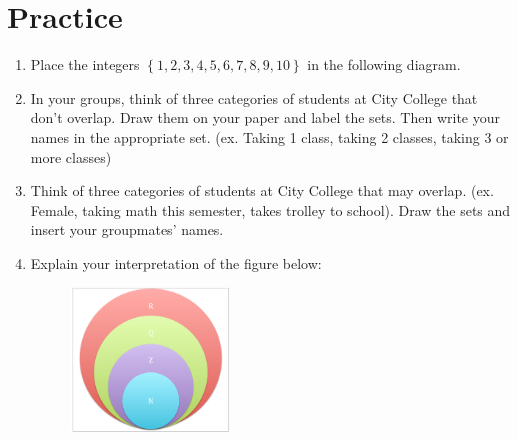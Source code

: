 \documentclass{article}
\begin{document}
\section*{Practice}
\begin{enumerate}[resume]
\item Place the integers \(\left\{1,2,3,4,5,6,7,8,9,10\right\}\) in the following diagram.
  \begin{figure}[h!]
    \centering
  \end{figure}
\item In your groups, think of three categories of students at City College that don’t overlap.  Draw them on your paper and label the sets.  Then write your names in the appropriate set. (ex.  Taking 1 class, taking 2 classes, taking 3 or more classes)

  \vfill
\item Think of three categories of students at City College that may overlap. (ex.  Female, taking math this semester, takes trolley to school). Draw the sets and insert your groupmates’ names.

  \vfill

  \clearpage
\item Explain your interpretation of the figure below:

  \begin{figure}[h!]
    \centering
    \includegraphics[width=0.4\textwidth]{numbers.png}
  \end{figure}


\end{enumerate}
\end{document}
